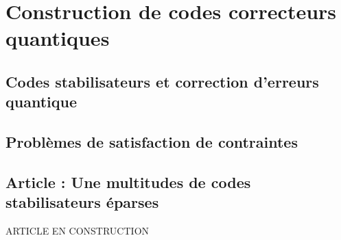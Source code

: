 \begin{comment}
\end{comment}

\chapter{Construction de codes correcteurs quantiques}

\section{Codes stabilisateurs et correction d'erreurs quantique}

\section{Problèmes de satisfaction de contraintes}

\section{Article : Une multitudes de codes stabilisateurs éparses}

ARTICLE EN CONSTRUCTION
